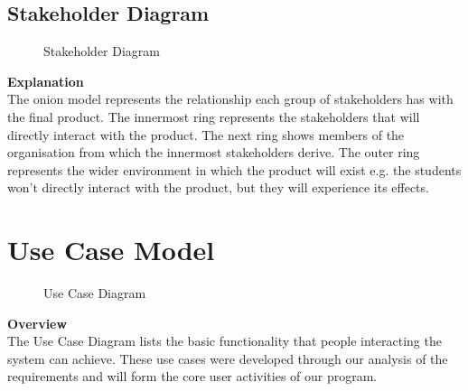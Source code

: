 \documentclass[a4paper]{article}
\begin{document}
\clearpage
\subsection{Stakeholder Diagram}

\begin{figure}[!ht]
    \centering
    \caption{Stakeholder Diagram}
    \label{fig:stakeholder}
\end{figure}

\textbf{Explanation} \\
The onion model represents the relationship each group of stakeholders has with the final product. The innermost ring represents the stakeholders that will directly interact with the product. The next ring shows members of the organisation from which the innermost stakeholders derive. The outer ring represents the wider environment in which the product will exist e.g. the students won't directly interact with the product, but they will experience its effects.

\clearpage
\section{Use Case Model}
\begin{figure}[!ht]
    \centering{} %
    \caption{Use Case Diagram}
    \label{fig:usecase}
\end{figure}
\textbf{Overview} \\
 The Use Case Diagram lists the basic functionality that people interacting the system can achieve. These use cases were developed through our analysis of the requirements and will form the core user activities of our program.
\end{document}
